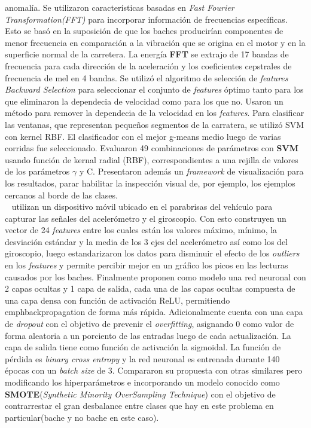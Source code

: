 anomalía. Se utilizaron características basadas en \emph{Fast Fourier Transformation(FFT)} para incorporar información de frecuencias específicas. Esto se basó en la
suposición de que los baches producirían componentes de menor frecuencia en comparación a la vibración que se origina en el motor y en la superficie normal de la carretera.
La energía \textbf{FFT} se extrajo de 17 bandas de frecuencia para cada dirección de la aceleración y los coeficientes cepstrales de frecuencia de mel en 4 bandas. Se
utilizó el algoritmo de selección de \emph{features} \emph{Backward Selection} para seleccionar el conjunto de \emph{features} óptimo tanto para los que eliminaron la
dependecia de velocidad como para los que no. Usaron un método para remover la dependecia de la velocidad en los \emph{features}. Para clasificar las ventanas, que representan 
pequeños segmentos de la carratera, se utilizó SVM con kernel RBF. El clasificador con el mejor g-means medio luego de varias corridas fue seleccionado. Evaluaron 49 combinaciones 
de parámetros con \textbf{SVM} usando función de kernal radial (RBF), correspondientes a una rejilla de valores de los parámetros $\gamma$ y C. Presentaron además un \emph{framework}
de visualización para los resultados, parar habilitar la inspección visual de, por ejemplo, los ejemplos cercanos al borde de las clases.\\

~\parencite{pawar2020efficient} utilizan un dispositivo móvil ubicado en el parabrisas del vehículo para capturar las señales del acelerómetro y el giroscopio. Con esto
construyen un vector de 24 \emph{features} entre los cuales están los valores máximo, mínimo, la desviación estándar y la media de los 3 ejes del acelerómetro así
como los del giroscopio, luego estandarizaron los datos para disminuir el efecto de los \emph{outliers} en los \emph{features} y permite percibir mejor en un gráfico
los picos en las lecturas causados por los baches. Finalmente proponen como modelo una red neuronal con 2 capas ocultas y 1 capa de salida, cada una de las capas ocultas
compuesta de una capa densa con función de activación ReLU, permitiendo \\emph{backpropagation} de forma más rápida. Adicionalmente cuenta con una capa de \emph{dropout}
con el objetivo de prevenir el \emph{overfitting}, asignando 0 como valor de forma aleatoria a un porciento de las entradas luego de cada actualización. La capa de salida 
tiene como función de activación la sigmoidal. La función de pérdida es \emph{binary cross entropy} y la red neuronal es entrenada durante 140 épocas con un \emph{batch size}
de 3. Compararon su propuesta con otras similares pero modificando los hiperparámetros e incorporando un modelo conocido como \textbf{SMOTE}(\emph{Synthetic Minority
OverSampling Technique}) con el objetivo de contrarrestar el gran desbalance entre clases que hay en este problema en particular(bache y no bache en este caso).\\

